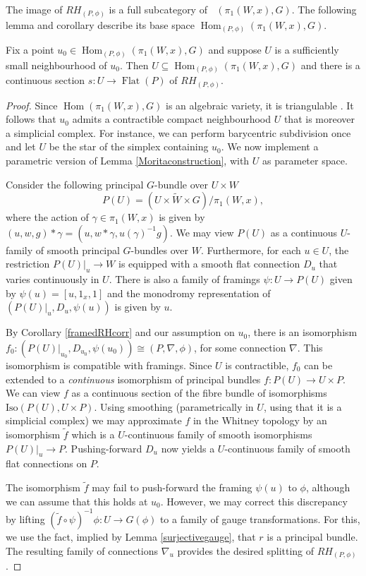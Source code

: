 \documentclass[10pt]{amsart}
\newcommand{\Hom}{\operatorname{Hom}}
\newcommand{\FlatObj}{{\operatorname{Flat}}}
\DeclareMathOperator{\Rep}{\underline{\operatorname{Rep}}}
\numberwithin{theoremalpha}{section}
\numberwithin{equation}{section}
\numberwithin{definition}{section}
\numberwithin{theorem}{section}
\numberwithin{proposition}{section}
\numberwithin{lemma}{section}
\numberwithin{example}{section}
\numberwithin{remark}{section}
\numberwithin{corollary}{section}
\numberwithin{question}{section}
\numberwithin{problem}{section}
\numberwithin{assumption}{section}
\theoremstyle{named}
\numberwithin{equation}{section}
\begin{document}
The image of $RH_{(P,\phi)}$ is a full subcategory of $\Rep(\pi_{1}(W, x), G)$. The following lemma and corollary describe its base space $\Hom_{(P,\phi)}(\pi_{1}(W,x), G)$.
\begin{lemma} \label{splittingofRHlemma}
Fix a point $u_{0} \in \Hom_{(P,\phi)}(\pi_{1}(W, x), G)$ and suppose $U$ is a sufficiently small neighbourhood of $u_0$. Then $U \subseteq \Hom_{(P,\phi)}(\pi_{1}(W, x), G)$ and there is a continuous section $s: U \to \FlatObj(P)$ of $RH_{(P,\phi)}$. 
\end{lemma}
\begin{proof}
Since $\Hom(\pi_{1}(W, x), G)$ is an algebraic variety, it is triangulable \cite{Whitney57}. It follows that $u_0$ admits a contractible compact neighbourhood $U$ that is moreover a simplicial complex. For instance, we can perform barycentric subdivision once and let $U$ be the star of the simplex containing $u_0$. We now implement a parametric version of Lemma \ref{Moritaconstruction}, with $U$ as parameter space.

Consider the following principal $G$-bundle over $U \times W$
\[ P(U) = (U \times \widetilde{W} \times G)/\pi_{1}(W, x), \]
where the action of $\gamma \in \pi_{1}(W,x)$ is given by $(u, w, g) \ast \gamma = (u, w \ast \gamma, u(\gamma)^{-1}g)$. We may view $P(U)$ as a continuous $U$-family of smooth principal $G$-bundles over $W$. Furthermore, for each $u \in U$, the restriction $P(U)|_{u} \to W$ is equipped with a smooth flat connection $D_{u}$ that varies continuously in $U$. There is also a family of framings $\psi: U \to P(U)$ given by $\psi(u) = [u, 1_{x}, 1]$ and the monodromy representation of $(P(U)|_{u}, D_{u}, \psi(u))$ is given by $u$. 

By Corollary \ref{framedRHcorr} and our assumption on $u_{0}$, there is an isomorphism $f_{0} : (P(U)|_{u_{0}}, D_{u_{0}}, \psi(u_{0})) \cong (P, \nabla, \phi)$, for some connection $\nabla$. This isomorphism is compatible with framings. Since $U$ is contractible, $f_{0}$ can be extended to a \emph{continuous} isomorphism of principal bundles $f: P(U) \to U \times P$. We can view $f$ as a continuous section of the fibre bundle of isomorphisms $\mathrm{Iso}(P(U), U \times P)$. Using smoothing (parametrically in $U$, using that it is a simplicial complex) we may approximate $f$ in the Whitney topology by an isomorphism $\tilde{f}$ which is a $U$-continuous family of smooth isomorphisms $P(U)|_{u} \to P$. Pushing-forward $D_{u}$ now yields a $U$-continuous family of smooth flat connections on $P$. 

The isomorphism $\tilde{f}$ may fail to push-forward the framing $\psi(u)$ to $\phi$, although we can assume that this holds at $u_{0}$. However, we may correct this discrepancy by lifting $(\tilde{f} \circ \psi)^{-1} \phi : U \to G(\phi)$ to a family of gauge transformations. For this, we use the fact, implied by Lemma \ref{surjectivegauge}, that $r$ is a principal bundle. The resulting family of connections $\nabla_{u}$ provides the desired splitting of $RH_{(P,\phi)}$. 
\end{proof}
\end{document}
